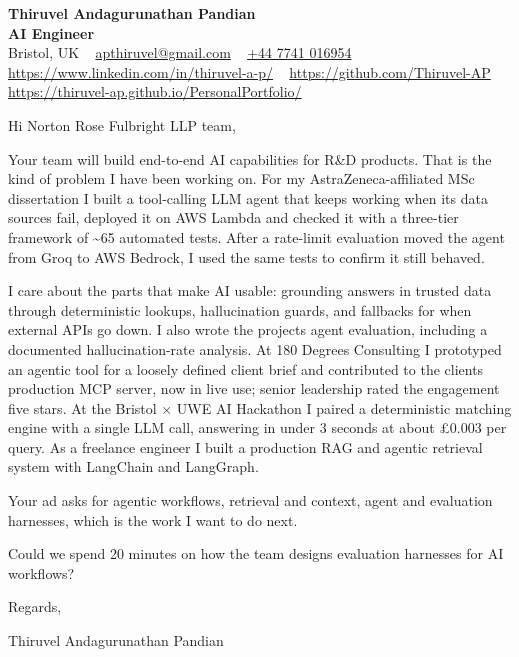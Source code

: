 \documentclass[11pt,a4paper]{article}
\begin{document}
\raggedright
\pagestyle{empty}

\begin{center}
    {\LARGE \color{linkblue} \textbf{Thiruvel Andagurunathan Pandian}}\\[0.2cm]
    {\color{headernavy}\small\textbf{AI Engineer}}\\[0.2cm]
    {\small Bristol, UK\nobreak\ \,\textbar\, \href{mailto:apthiruvel@gmail.com}{apthiruvel@gmail.com}\nobreak\ \,\textbar\, \href{tel:+447741016954}{+44 7741 016954}\nobreak\ \,\textbar\, \href{https://www.linkedin.com/in/thiruvel-a-p/}{https://www.linkedin.com/in/thiruvel-a-p/}\nobreak\ \,\textbar\, \href{https://github.com/Thiruvel-AP}{https://github.com/Thiruvel-AP}\nobreak\ \,\textbar\, \href{https://thiruvel-ap.github.io/PersonalPortfolio/}{https://thiruvel-ap.github.io/PersonalPortfolio/}}

\end{center}

\vspace{0.4cm}

\noindent
Hi Norton Rose Fulbright LLP team,

Your team will build end-to-end AI capabilities for R\&D products. That is the kind of problem I have been working on. For my AstraZeneca-affiliated MSc dissertation I built a tool-calling LLM agent that keeps working when its data sources fail, deployed it on AWS Lambda and checked it with a three-tier framework of \textasciitilde{}65 automated tests. After a rate-limit evaluation moved the agent from Groq to AWS Bedrock, I used the same tests to confirm it still behaved.

I care about the parts that make AI usable: grounding answers in trusted data through deterministic lookups, hallucination guards, and fallbacks for when external APIs go down. I also wrote the project\textquotesingle{}s agent evaluation, including a documented hallucination-rate analysis. At 180 Degrees Consulting I prototyped an agentic tool for a loosely defined client brief and contributed to the client\textquotesingle{}s production MCP server, now in live use; senior leadership rated the engagement five stars. At the Bristol × UWE AI Hackathon I paired a deterministic matching engine with a single LLM call, answering in under 3 seconds at about £0.003 per query. As a freelance engineer I built a production RAG and agentic retrieval system with LangChain and LangGraph.

Your ad asks for agentic workflows, retrieval and context, agent and evaluation harnesses, which is the work I want to do next.

Could we spend 20 minutes on how the team designs evaluation harnesses for AI workflows?

\vspace{0.5cm}

Regards,

Thiruvel Andagurunathan Pandian
\end{document}
